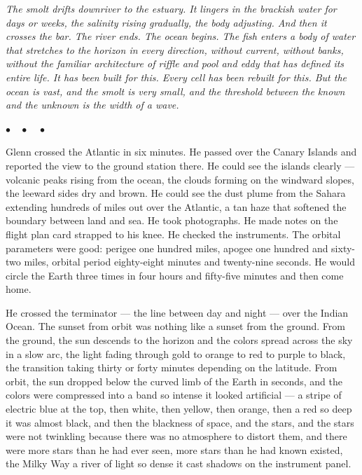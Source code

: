 \documentclass[12pt, letterpaper]{article}
\begin{document}
\emph{The smolt drifts downriver to the estuary. It lingers in the brackish water for days or weeks, the salinity rising gradually, the body adjusting. And then it crosses the bar. The river ends. The ocean begins. The fish enters a body of water that stretches to the horizon in every direction, without current, without banks, without the familiar architecture of riffle and pool and eddy that has defined its entire life. It has been built for this. Every cell has been rebuilt for this. But the ocean is vast, and the smolt is very small, and the threshold between the known and the unknown is the width of a wave.}

\begin{center}
$\bullet\quad\bullet\quad\bullet$
\end{center}

Glenn crossed the Atlantic in six minutes. He passed over the Canary Islands and reported the view to the ground station there. He could see the islands clearly --- volcanic peaks rising from the ocean, the clouds forming on the windward slopes, the leeward sides dry and brown. He could see the dust plume from the Sahara extending hundreds of miles out over the Atlantic, a tan haze that softened the boundary between land and sea. He took photographs. He made notes on the flight plan card strapped to his knee. He checked the instruments. The orbital parameters were good: perigee one hundred miles, apogee one hundred and sixty-two miles, orbital period eighty-eight minutes and twenty-nine seconds. He would circle the Earth three times in four hours and fifty-five minutes and then come home.

He crossed the terminator --- the line between day and night --- over the Indian Ocean. The sunset from orbit was nothing like a sunset from the ground. From the ground, the sun descends to the horizon and the colors spread across the sky in a slow arc, the light fading through gold to orange to red to purple to black, the transition taking thirty or forty minutes depending on the latitude. From orbit, the sun dropped below the curved limb of the Earth in seconds, and the colors were compressed into a band so intense it looked artificial --- a stripe of electric blue at the top, then white, then yellow, then orange, then a red so deep it was almost black, and then the blackness of space, and the stars, and the stars were not twinkling because there was no atmosphere to distort them, and there were more stars than he had ever seen, more stars than he had known existed, the Milky Way a river of light so dense it cast shadows on the instrument panel.
\end{document}

